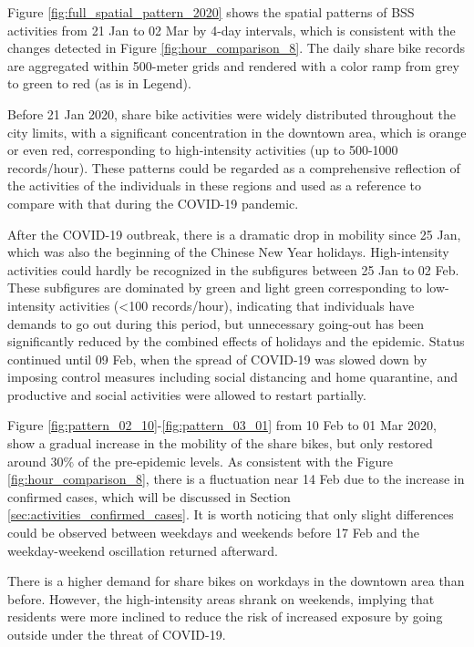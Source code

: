 \documentclass[ijgi,submit,moreauthors,pdftex]{Definitions/mdpi}
\begin{document}
Figure \ref{fig:full_spatial_pattern_2020} shows the spatial patterns of BSS activities from 21 Jan to 02 Mar by 4-day intervals, which is consistent with the changes detected in Figure \ref{fig:hour_comparison_8}. %
The daily share bike records are aggregated within 500-meter grids and rendered with a color ramp from grey to green to red (as is in Legend).

Before 21 Jan 2020, share bike activities were widely distributed throughout the city limits, with a significant concentration in the downtown area, which is orange or even red, corresponding to high-intensity activities (up to 500-1000 records/hour).
These patterns could be regarded as a comprehensive reflection of the activities of the individuals in these regions and used as a reference to compare with that during the COVID-19 pandemic.

After the COVID-19 outbreak, there is a dramatic drop in mobility since 25 Jan, which was also the beginning of the Chinese New Year holidays.
High-intensity activities could hardly be recognized in the subfigures between 25 Jan to 02 Feb. 
These subfigures are dominated by green and light green corresponding to low-intensity activities (<100 records/hour), indicating that individuals have demands to go out during this period, but unnecessary going-out has been significantly reduced by the combined effects of holidays and the epidemic.
Status continued until 09 Feb, when the spread of COVID-19 was slowed down by imposing control measures including social distancing and home quarantine, and productive and social activities were allowed to restart partially.

Figure \ref{fig:pattern_02_10}-\ref{fig:pattern_03_01} from 10 Feb to 01 Mar 2020, show a gradual increase in the mobility of the share bikes, but only restored around $30\%$ of the pre-epidemic levels.
As consistent with the Figure \ref{fig:hour_comparison_8}, there is a fluctuation near 14 Feb due to the increase in confirmed cases, which will be discussed in Section \ref{sec:activities_confirmed_cases}.
It is worth noticing that only slight differences could be observed between weekdays and weekends before 17 Feb and the weekday-weekend oscillation returned afterward.

There is a higher demand for share bikes on workdays in the downtown area than before.
However, the high-intensity areas shrank on weekends, implying that residents were more inclined to reduce the risk of increased exposure by going outside under the threat of COVID-19. 
\end{document}
